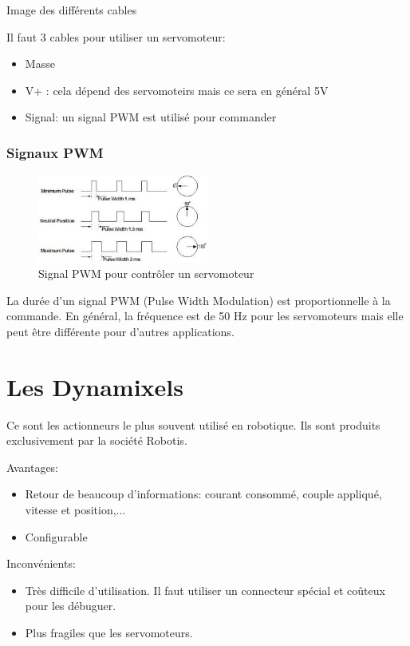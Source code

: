 \documentclass[a4paper, 11pt]{report}
\begin{document}
Image des différents cables

Il faut 3 cables pour utiliser un servomoteur:
\begin{itemize}
\item Masse
\item V+ : cela dépend des servomoteirs mais ce sera en général 5V
\item Signal: un signal PWM est utilisé pour commander 
\end{itemize}

\subsubsection{Signaux PWM}

\begin{figure}[h]
\begin{centering}
\includegraphics[width=0.5\textwidth]{images/PWMservo.jpeg}
\caption{Signal PWM pour contrôler un servomoteur}
\par\end{centering}
\end{figure}

La durée d'un signal PWM (Pulse Width Modulation) est proportionnelle à la commande. En général, la fréquence est de 50 Hz pour les servomoteurs mais elle peut être différente pour d'autres applications.

\section{Les Dynamixels}
Ce sont les actionneurs le plus souvent utilisé en robotique. Ils sont produits exclusivement par la société Robotis.

Avantages:
\begin{itemize}
\item Retour de beaucoup d'informations: courant consommé, couple appliqué, vitesse et position,...
\item Configurable
\end{itemize}

Inconvénients:
\begin{itemize}
\item Très difficile d'utilisation. Il faut utiliser un connecteur spécial et coûteux pour les débuguer.
\item Plus fragiles que les servomoteurs.
\end{itemize} 
\end{document}
